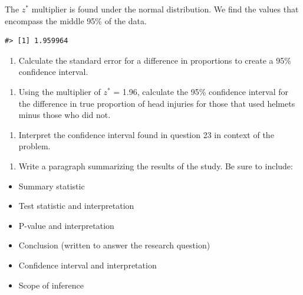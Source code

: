 \documentclass[
]{report}
\newenvironment{Shaded}{\begin{snugshade}}{\end{snugshade}}
\newcommand{\CommentTok}[1]{\textcolor[rgb]{0.56,0.35,0.01}{\textit{#1}}}
\newcommand{\FloatTok}[1]{\textcolor[rgb]{0.00,0.00,0.81}{#1}}
\newcommand{\KeywordTok}[1]{\textcolor[rgb]{0.13,0.29,0.53}{\textbf{#1}}}
\newcommand{\NormalTok}[1]{#1}
\newcommand{\OperatorTok}[1]{\textcolor[rgb]{0.81,0.36,0.00}{\textbf{#1}}}
\newcommand{\StringTok}[1]{\textcolor[rgb]{0.31,0.60,0.02}{#1}}
\providecommand{\tightlist}{%
  \setlength{\itemsep}{0pt}\setlength{\parskip}{0pt}}
\begin{document}
The \(z^*\) multiplier is found under the normal distribution. We find the values that encompass the middle 95\% of the data.

\begin{Shaded}
\end{Shaded}

\begin{verbatim}
#> [1] 1.959964
\end{verbatim}

\begin{enumerate}
\def\labelenumi{\arabic{enumi}.}
\setcounter{enumi}{21}
\tightlist
\item
  Calculate the standard error for a difference in proportions to create a 95\% confidence interval.
\end{enumerate}

\vspace{1in}

\begin{enumerate}
\def\labelenumi{\arabic{enumi}.}
\setcounter{enumi}{22}
\tightlist
\item
  Using the multiplier of \(z^*\) = 1.96, calculate the 95\% confidence interval for the difference in true proportion of head injuries for those that used helmets minus those who did not.
\end{enumerate}

\vspace{1in}

\begin{enumerate}
\def\labelenumi{\arabic{enumi}.}
\setcounter{enumi}{23}
\tightlist
\item
  Interpret the confidence interval found in question 23 in context of the problem.
\end{enumerate}

\vspace{1in}

\begin{enumerate}
\def\labelenumi{\arabic{enumi}.}
\setcounter{enumi}{24}
\tightlist
\item
  Write a paragraph summarizing the results of the study. Be sure to include:
\end{enumerate}

\begin{itemize}
\item
  Summary statistic
\item
  Test statistic and interpretation
\item
  P-value and interpretation
\item
  Conclusion (written to answer the research question)
\item
  Confidence interval and interpretation
\item
  Scope of inference
\end{itemize}
\end{document}
